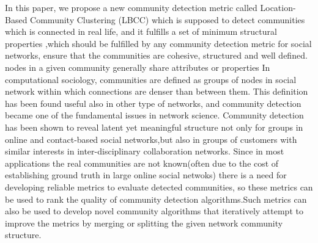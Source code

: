 In this paper, we propose a new community detection metric called Location-Based Community Clustering (LBCC) 
which is supposed to detect communities which is connected in real life, and it fulfills a set of minimum structural properties ,which should
be  fulfilled by any community detection metric for social networks, ensure  that the communities are cohesive, structured and well defined.
nodes in a given community generally share attributes or properties
In computational sociology, communities are defined as groups of nodes in social network within which connections are denser than between them. This definition has been found useful also in other type of networks, and community detection became one of the fundamental issues in network science. Community detection has been shown to reveal latent yet meaningful structure not only for groups in online and contact-based social networks,but also in groups of customers with similar interests in inter-disciplinary collaboration networks.
Since in most applications the real communities are not known(often due to the cost of establishing ground truth in large online social netwoks) there is a need for developing reliable metrics to evaluate detected communities, so these metrics can be used to rank the quality of community detection algorithms.Such metrics can also be used to develop novel community algorithms that iteratively attempt to improve the metrics by merging or splitting the given network community structure.

